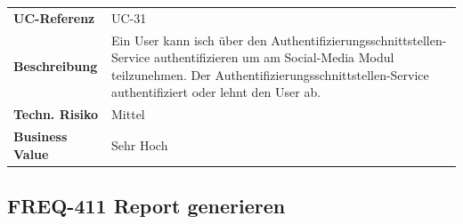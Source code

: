 \begin{longtable}[c]{@{}ll@{}}
\toprule
\begin{minipage}[t]{0.20\columnwidth}\raggedright\strut
\textbf{UC-Referenz}
\strut\end{minipage} &
\begin{minipage}[t]{0.74\columnwidth}\raggedright\strut
UC-31
\strut\end{minipage}\tabularnewline
\begin{minipage}[t]{0.20\columnwidth}\raggedright\strut
\textbf{Beschreibung}
\strut\end{minipage} &
\begin{minipage}[t]{0.74\columnwidth}\raggedright\strut
Ein User kann isch über den Authentifizierungsschnittstellen-Service
authentifizieren um am Social-Media Modul teilzunehmen. Der
Authentifizierungsschnittstellen-Service authentifiziert oder lehnt den
User ab.
\strut\end{minipage}\tabularnewline
\begin{minipage}[t]{0.20\columnwidth}\raggedright\strut
\textbf{Techn. Risiko}
\strut\end{minipage} &
\begin{minipage}[t]{0.74\columnwidth}\raggedright\strut
Mittel
\strut\end{minipage}\tabularnewline
\begin{minipage}[t]{0.20\columnwidth}\raggedright\strut
\textbf{Business Value}
\strut\end{minipage} &
\begin{minipage}[t]{0.74\columnwidth}\raggedright\strut
Sehr Hoch
\strut\end{minipage}\tabularnewline
\bottomrule
\end{longtable}

\subsection{FREQ-411 Report
generieren}\label{freq-411-report-generieren}

